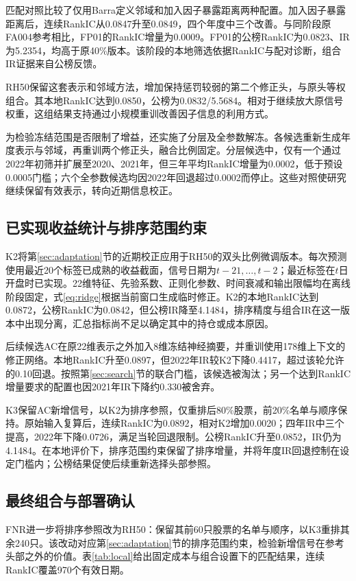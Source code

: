 \documentclass[UTF8,11pt,a4paper,fontset=fandol]{ctexart}
\begin{document}
匹配对照比较了仅用Barra定义邻域和加入因子暴露距离两种配置。加入因子暴露距离后，连续RankIC从0.0847升至0.0849，四个年度中三个改善。与同阶段原FA004参考相比，FP01的RankIC增量为0.0009。FP01的公榜RankIC为0.0823、IR为5.2354，均高于原40\%版本。该阶段的本地筛选依据RankIC与配对诊断，组合IR证据来自公榜反馈。

RH50保留这套表示和邻域方法，增加保持惩罚较弱的第二个修正头，与原头等权组合。其本地RankIC达到0.0850，公榜为0.0832/5.5684。相对于继续放大原信号权重，这组结果支持通过小规模重训改善因子信息的利用方式。

为检验冻结范围是否限制了增益，还实施了分层及全参数解冻。各候选重新生成年度表示与邻域，再重训两个修正头，融合比例固定。分层候选中，仅有一个通过2022年初筛并扩展至2020、2021年，但三年平均RankIC增量为0.0002，低于预设0.0005门槛；六个全参数候选均因2022年回退超过0.0002而停止。这些对照使研究继续保留有效表示，转向近期信息校正。

\subsection{已实现收益统计与排序范围约束}
K2将第\ref{sec:adaptation}节的近期校正应用于RH50的双头比例微调版本。每次预测使用最近20个标签已成熟的收益截面，信号日期为$t-21,\ldots,t-2$；最近标签在$t$日开盘时已实现。22维特征、先验系数、正则化参数、时间衰减和输出限幅均在离线阶段固定，式\eqref{eq:ridge}根据当前窗口生成临时修正。K2的本地RankIC达到0.0872，公榜RankIC为0.0842，但公榜IR降至4.1484，排序精度与组合IR在这一版本中出现分离，汇总指标尚不足以确定其中的持仓或成本原因。

后续候选AC在原22维表示之外加入8维冻结神经摘要，并重训使用178维上下文的修正网络。本地RankIC升至0.0897，但2022年IR较K2下降0.4417，超过该轮允许的0.10回退。按照第\ref{sec:search}节的联合门槛，该候选被淘汰；另一个达到RankIC增量要求的配置也因2021年IR下降约0.330被舍弃。

K3保留AC新增信号，以K2为排序参照，仅重排后80\%股票，前20\%名单与顺序保持。原始输入复算后，连续RankIC为0.0892，相对K2增加0.0020；四年IR中三个提高，2022年下降0.0726，满足当轮回退限制。公榜RankIC升至0.0852，IR仍为4.1484。在本地评价下，排序范围约束保留了排序增量，并将年度IR回退控制在设定门槛内；公榜结果促使后续重新选择头部参照。

\subsection{最终组合与部署确认}
FNR进一步将排序参照改为RH50：保留其前60只股票的名单与顺序，以K3重排其余240只。该改动对应第\ref{sec:adaptation}节的排序范围约束，检验新增信号在参考头部之外的价值。表\ref{tab:local}给出固定成本与组合设置下的匹配结果，连续RankIC覆盖970个有效日期。
\end{document}

